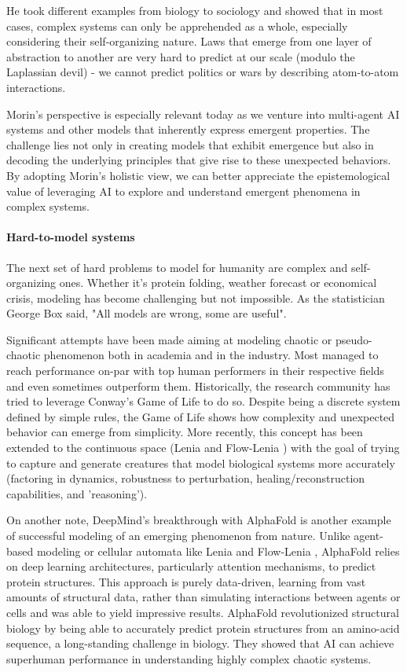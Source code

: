 \documentclass[11pt]{article}
\begin{document}
He took different examples from biology to sociology and showed that in most cases, complex systems can only be apprehended as a whole, especially considering their self-organizing nature. Laws that emerge from one layer of abstraction to another are very hard to predict at our scale (modulo the Laplassian devil) - we cannot predict politics or wars by describing atom-to-atom interactions. 

Morin's perspective is especially relevant today as we venture into multi-agent AI systems and other models that inherently express emergent properties. The challenge lies not only in creating models that exhibit emergence but also in decoding the underlying principles that give rise to these unexpected behaviors. By adopting Morin's holistic view, we can better appreciate the epistemological value of leveraging AI to explore and understand emergent phenomena in complex systems.

\paragraph{Hard-to-model systems}The next set of hard problems to model for humanity are complex and self-organizing ones. Whether it's protein folding, weather forecast or economical crisis, modeling has become challenging but not impossible. As the statistician George Box said, "All models are wrong, some are useful".

Significant attempts have been made aiming at modeling chaotic or pseudo-chaotic phenomenon both in academia and in the industry. Most managed to reach performance on-par with top human performers in their respective fields and even sometimes outperform them. 
Historically, the research community has tried to leverage Conway's Game of Life \cite{conway} to do so. Despite being a discrete system defined by simple rules, the Game of Life shows how complexity and unexpected behavior can emerge from simplicity. More recently, this concept has been extended to the continuous space (Lenia \cite{lenia} and Flow-Lenia \cite{flowlenia}) with the goal of trying to capture and generate creatures that model biological systems more accurately (factoring in dynamics, robustness to perturbation, healing/reconstruction capabilities, and 'reasoning').

On another note, DeepMind's breakthrough with AlphaFold \cite{alphafold} is another example of successful modeling of an emerging phenomenon from nature. Unlike agent-based modeling or cellular automata like Lenia \cite{lenia} and Flow-Lenia \cite{flowlenia}, AlphaFold relies on deep learning architectures, particularly attention mechanisms, to predict protein structures. This approach is purely data-driven, learning from vast amounts of structural data, rather than simulating interactions between agents or cells and was able to yield impressive results. AlphaFold revolutionized structural biology by being able to accurately predict protein structures from an amino-acid sequence, a long-standing challenge in biology. They showed that AI can achieve superhuman performance in understanding highly complex chaotic systems.
\end{document}
